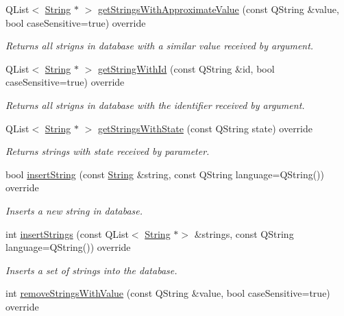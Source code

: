 \begin{DoxyCompactItemize}
Q\+List$<$ \mbox{\hyperlink{classString}{String}} $\ast$ $>$ \mbox{\hyperlink{classFpFileConnector_adc85e526e1dab9f3de03cb8a2f33f7d1}{get\+Strings\+With\+Approximate\+Value}} (const Q\+String \&value, bool case\+Sensitive=true) override
\begin{DoxyCompactList}\small\item\em Returns all strigns in database with a similar value received by argument. \end{DoxyCompactList}\item 
Q\+List$<$ \mbox{\hyperlink{classString}{String}} $\ast$ $>$ \mbox{\hyperlink{classFpFileConnector_a29a6df6ea88a1e44f6b04c600b45925c}{get\+String\+With\+Id}} (const Q\+String \&id, bool case\+Sensitive=true) override
\begin{DoxyCompactList}\small\item\em Returns all strigns in database with the identifier received by argument. \end{DoxyCompactList}\item 
Q\+List$<$ \mbox{\hyperlink{classString}{String}} $\ast$ $>$ \mbox{\hyperlink{classFpFileConnector_a4c671329fd2fd1b9c3a7d72de1028afd}{get\+Strings\+With\+State}} (const Q\+String state) override
\begin{DoxyCompactList}\small\item\em Returns strings with state received by parameter. \end{DoxyCompactList}\item 
bool \mbox{\hyperlink{classFpFileConnector_ae4f79d6a1281a20702b0257de56822b2}{insert\+String}} (const \mbox{\hyperlink{classString}{String}} \&string, const Q\+String language=Q\+String()) override
\begin{DoxyCompactList}\small\item\em Inserts a new string in database. \end{DoxyCompactList}\item 
int \mbox{\hyperlink{classFpFileConnector_a7f31d3e699ce4c489c2303370d032a7e}{insert\+Strings}} (const Q\+List$<$ \mbox{\hyperlink{classString}{String}} $\ast$$>$ \&strings, const Q\+String language=Q\+String()) override
\begin{DoxyCompactList}\small\item\em Inserts a set of strings into the database. \end{DoxyCompactList}\item 
int \mbox{\hyperlink{classFpFileConnector_a57c6eafd6b4c7dfbd927f6d4cb63d25c}{remove\+Strings\+With\+Value}} (const Q\+String \&value, bool case\+Sensitive=true) override
$$
\end{DoxyCompactItemize}
